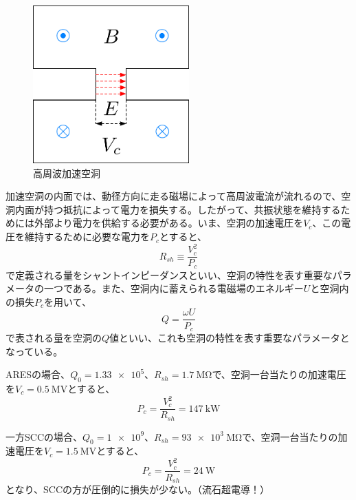 \documentclass[10pt,a4paper]{ltjsarticle}
\begin{document}
\begin{figure}[hbt]
  \begin{center}
    \includegraphics[width=6cm,clip]{figs/cavity3.pdf}
    \caption{高周波加速空洞}
   \label{cavity3}
  \end{center}
\end{figure}

加速空洞の内面では、動径方向に走る磁場によって高周波電流が流れるので、空洞内面が持つ抵抗によって電力を損失する。したがって、共振状態を維持するためには外部より電力を供給する必要がある。いま、空洞の加速電圧を$V_{c}$、この電圧を維持するために必要な電力を$P_{c}$とすると、
%
\begin{equation}
  R_{sh} \equiv \frac{V_{c}^2}{P_{c}}
  \label{sh}
\end{equation}
%
で定義される量をシャントインピーダンスといい、空洞の特性を表す重要なパラメータの一つである。また、空洞内に蓄えられる電磁場のエネルギー$U$と空洞内の損失$P_{c}$を用いて、
%
\begin{equation}
  Q = \frac{\omega U}{P_{c}}
  \label{q_val}
\end{equation}
%
で表される量を空洞の$Q$値といい、これも空洞の特性を表す重要なパラメータとなっている。

\begin{tcolorbox}[title=\textgt{ARESとSCCの空洞損失}]
  ARESの場合、$Q_{0}=\num{1.33e5}$、$R_{sh}=\SI{1.7}{\mega \ohm}$で、空洞一台当たりの加速電圧を$V_{c}=\SI{0.5}{\mega\volt}$とすると、
%
\begin{equation*}
  P_{c} = \frac{V_{c}^2}{R_{sh}}=\SI{147}{\kilo \watt}
\end{equation*}

一方SCCの場合、$Q_{0}=\num{1e9}$、$R_{sh}=\SI{93e3}{\mega\ohm}$で、空洞一台当たりの加速電圧を$V_{c}=\SI{1.5}{\mega\volt}$とすると、
%
\begin{equation*}
  P_{c} = \frac{V_{c}^2}{R_{sh}}=\SI{24}{\watt}
\end{equation*}
%
となり、SCCの方が圧倒的に損失が少ない。（流石超電導！）
\end{tcolorbox}
\end{document}
